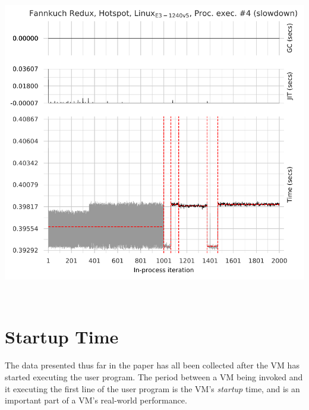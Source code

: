\documentclass[acmsmall,screen]{acmart}
\begin{document}
\begin{table}[t]
\begin{minipage}[t]{0.485\textwidth}%
\vspace{0pt}
\centering
\includegraphics[width=\textwidth]{examples/unexplained_weirdness.pdf}
\end{minipage}
\hfill
\begin{minipage}[t]{0.485\textwidth}
\vspace{0pt}
\centering

\end{minipage}
\\
\begin{minipage}[t]{0.485\textwidth}
\vspace{-\baselineskip}
\centering
{}
\label{fig:unexplained}
\end{minipage}
\hfill
\begin{minipage}[t]{0.485\textwidth}
\vspace{0pt}
\centering
{}
\label{fig:startup}
\end{minipage}
\end{table}


\section{Startup Time}
\label{sec:startup}
The data presented thus far in the paper has all been collected after the VM has
started executing the user program. The period between a VM being
invoked and it executing the first line of the user program is the VM's \emph{startup} time,
and is an important part of a VM's real-world performance.
\end{document}
